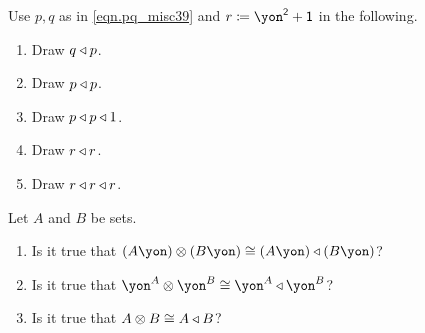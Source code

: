 \documentclass[DynamicalBook]{subfiles}
\begin{document}
\begin{exercise}
Use $p,q$ as in \cref{eqn.pq_misc39} and $r\coloneqq \yon^\2+\1$ in the following.
\begin{enumerate}
	\item Draw $q\mathbin{\triangleleft} p$.
	\item Draw $p\mathbin{\triangleleft} p$.
	\item Draw $p\mathbin{\triangleleft} p\mathbin{\triangleleft} 1$.
	\item Draw $r\mathbin{\triangleleft} r$.
	\item Draw $r\mathbin{\triangleleft} r\mathbin{\triangleleft} r$.
\qedhere
\end{enumerate}
\end{exercise}

\begin{exercise}
Let $A$ and $B$ be sets.
\begin{enumerate}
	\item Is it true that $(A\yon)\otimes(B\yon) \cong (A\yon)\tri (B\yon)$?
	\item Is it true that $\yon^A\otimes\yon^B\cong\yon^A\tri\yon^B$?
	\item Is it true that $A\otimes B\cong A\mathbin{\triangleleft} B$?
\qedhere
\end{enumerate}
\end{exercise}
\end{document}
